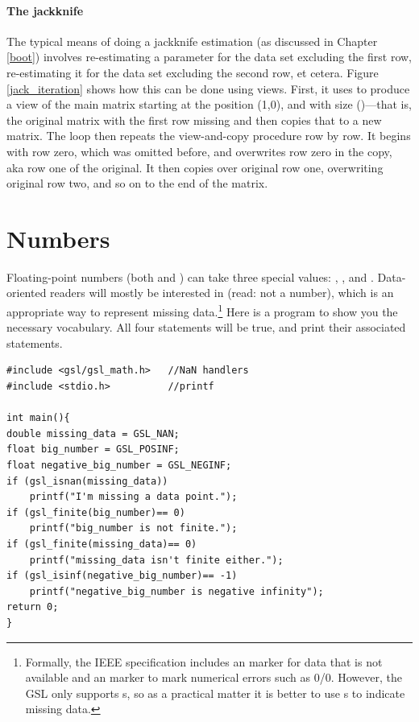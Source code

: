\paragraph{The jackknife}
The typical means of doing a jackknife estimation (as discussed in
Chapter \ref{boot}) involves re-estimating a parameter for the data set
excluding the first row, re-estimating it for the data set excluding the
second row, et cetera.  Figure \ref{jack_iteration}
shows how this can be done using views.  First, it uses
 to produce a view of the main matrix
starting at the position (1,0), and with size ()---that is, the original matrix with the first row missing
and then copies that to a new matrix. The  loop then repeats
the view-and-copy procedure row by row.  It begins with row zero, which
was omitted before, and overwrites row zero in the copy, aka row one of
the original. It then copies over original row one, overwriting original
row two, and so on to the end of the matrix.


\section{\treesymbol Numbers}       \label{numbers}
Floating-point numbers (both  and ) can take three special values: , , and . Data-oriented readers will mostly be
interested in  (read: not a number), which is an appropriate way to represent missing data.\footnote{Formally, the IEEE specification includes an  marker for data that is not available and an  marker to mark numerical errors such as 0/0. However, the GSL only supports s, so as a practical matter it is better to use s to indicate missing data.} Here is a
program to show you the necessary vocabulary. All four  statements will be true, and print their associated
statements.
\begin{lstlisting}
#include <gsl/gsl_math.h>   //NaN handlers
#include <stdio.h>          //printf

int main(){
double missing_data = GSL_NAN;
float big_number = GSL_POSINF;
float negative_big_number = GSL_NEGINF;
if (gsl_isnan(missing_data))
    printf("I'm missing a data point.");
if (gsl_finite(big_number)== 0)
    printf("big_number is not finite.");
if (gsl_finite(missing_data)== 0)
    printf("missing_data isn't finite either.");
if (gsl_isinf(negative_big_number)== -1)
    printf("negative_big_number is negative infinity");
return 0;
}
\end{lstlisting}

